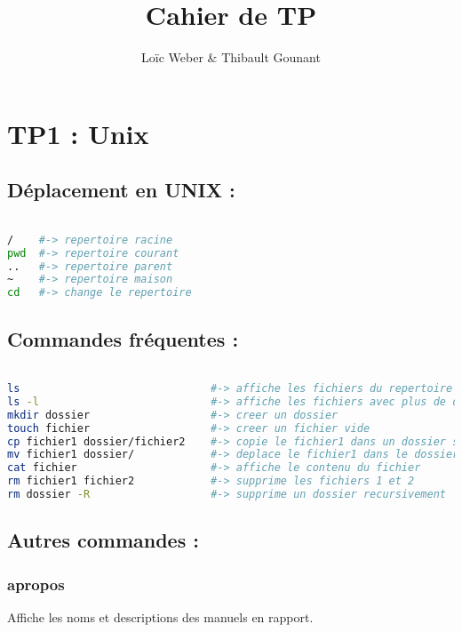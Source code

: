 \documentclass{article}
\author{Loïc Weber \& Thibault Gounant}
\title{Cahier de TP}
\begin{document}
\setlength\parindent{0pt}

\maketitle

\renewcommand*\contentsname{Table des matières}
\tableofcontents

\section{TP1 : Unix}

\subsection{Déplacement en UNIX :}

\begin{lstlisting}[language=bash]

/    #-> repertoire racine
pwd  #-> repertoire courant
..   #-> repertoire parent
~    #-> repertoire maison
cd   #-> change le repertoire

\end{lstlisting}

\subsection{Commandes fréquentes :}

\begin{lstlisting}[language=bash]

ls                              #-> affiche les fichiers du repertoire courant
ls -l                           #-> affiche les fichiers avec plus de details
mkdir dossier                   #-> creer un dossier
touch fichier                   #-> creer un fichier vide
cp fichier1 dossier/fichier2    #-> copie le fichier1 dans un dossier sous le nom fichier2
mv fichier1 dossier/            #-> deplace le fichier1 dans le dossier
cat fichier                     #-> affiche le contenu du fichier
rm fichier1 fichier2            #-> supprime les fichiers 1 et 2
rm dossier -R                   #-> supprime un dossier recursivement

\end{lstlisting}

\subsection{Autres commandes :}

\subsubsection{apropos}
Affiche les noms et descriptions des manuels en rapport.
\end{document}

